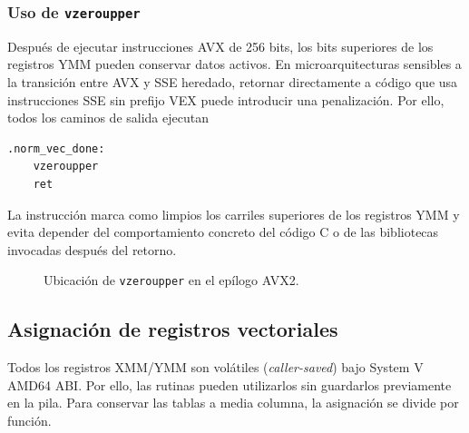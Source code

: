 \documentclass[journal]{IEEEtran}
\begin{document}
\subsubsection{Uso de \texttt{vzeroupper}}

Después de ejecutar instrucciones AVX de 256 bits, los bits superiores de los
registros YMM pueden conservar datos activos. En microarquitecturas sensibles a
la transición entre AVX y SSE heredado, retornar directamente a código que usa
instrucciones SSE sin prefijo VEX puede introducir una penalización. Por ello,
todos los caminos de salida ejecutan
\begin{lstlisting}[language={[x86masm]Assembler},caption={Limpieza del estado superior de los registros YMM.},label={lst:vzeroupper}]
.norm_vec_done:
    vzeroupper
    ret
\end{lstlisting}
La instrucción marca como limpios los carriles superiores de los registros YMM
y evita depender del comportamiento concreto del código C o de las bibliotecas
invocadas después del retorno.

\begin{figure}[H]
  \centering
  \caption{Ubicación de \texttt{vzeroupper} en el epílogo AVX2.}
  \label{fig:gdb-vzeroupper}
\end{figure}

\subsection{Asignación de registros vectoriales}

Todos los registros XMM/YMM son volátiles (\textit{caller-saved}) bajo System V
AMD64 ABI. Por ello, las rutinas pueden utilizarlos sin guardarlos previamente
en la pila. Para conservar las tablas a media columna, la asignación se divide
por función.
\end{document}
